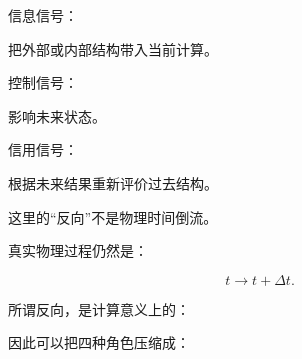 信息信号：

\begin{statementbox}
\centering
{}
\end{statementbox}

把外部或内部结构带入当前计算。

控制信号：

\begin{statementbox}
\centering
{}
\end{statementbox}

影响未来状态。

信用信号：

\begin{statementbox}
\centering
{}
\end{statementbox}

根据未来结果重新评价过去结构。

这里的“反向”不是物理时间倒流。

真实物理过程仍然是：

\[
t\rightarrow t+\Delta t.
\]

所谓反向，是计算意义上的：

\begin{statementbox}
\centering
{}
\end{statementbox}

因此可以把四种角色压缩成：

\begin{statementbox}
\centering
{}
\end{statementbox}

\begin{statementbox}
\centering
{}
\end{statementbox}

\begin{statementbox}
\centering
{}
\end{statementbox}

\begin{statementbox}
\centering
{}
\end{statementbox}

